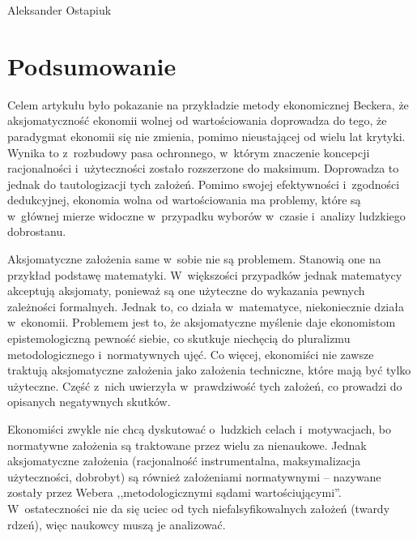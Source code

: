 \begin{artplenv}{Aleksander Ostapiuk}
\section*{Podsumowanie}
Celem artykułu było pokazanie na przykładzie metody ekonomicznej Beckera, że aksjomatyczność ekonomii wolnej od
wartościowania doprowadza do tego, że paradygmat ekonomii się nie zmienia, pomimo nieustającej od wielu lat krytyki.
Wynika to z~rozbudowy pasa ochronnego, w~którym znaczenie koncepcji racjonalności i~użyteczności zostało rozszerzone do
maksimum. Doprowadza to jednak do tautologizacji tych założeń. Pomimo swojej efektywności i~zgodności dedukcyjnej,
ekonomia wolna od wartościowania ma problemy, które są w~głównej mierze widoczne w~przypadku wyborów w~czasie i~analizy
ludzkiego dobrostanu.

Aksjomatyczne założenia same w~sobie nie są problemem. Stanowią one na przykład podstawę matematyki. W~większości
przypadków jednak matematycy akceptują aksjomaty, ponieważ są one użyteczne do wykazania pewnych zależności formalnych.
Jednak to, co działa w~matematyce, niekoniecznie działa w~ekonomii. Problemem jest to, że aksjomatyczne myślenie daje
ekonomistom epistemologiczną pewność siebie, co skutkuje niechęcią do pluralizmu metodologicznego i~normatywnych ujęć.
Co więcej, ekonomiści nie zawsze traktują aksjomatyczne założenia jako założenia techniczne, które mają być tylko
użyteczne. Część z~nich uwierzyła w~prawdziwość tych założeń, co prowadzi do opisanych negatywnych skutków.

Ekonomiści zwykle nie chcą dyskutować o~ludzkich celach i~motywacjach, bo normatywne założenia są traktowane przez wielu
za nienaukowe. Jednak aksjomatyczne założenia (racjonalność instrumentalna, maksymalizacja użyteczności, dobrobyt) są
również założeniami normatywnymi -- nazywane zostały przez Webera
\parencite*{weber_methodology_1949}
,,metodologicznymi
sądami wartościującymi''. W~ostateczności nie da się uciec od tych niefalsyfikowalnych założeń (twardy rdzeń), więc
naukowcy muszą je analizować.


\end{artplenv}
